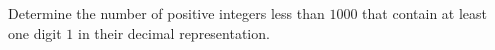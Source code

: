 Determine the number of positive integers less than $1000$ that contain at least one digit $1$ in their decimal representation.
